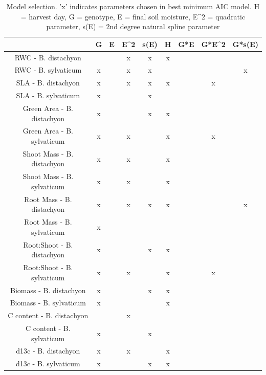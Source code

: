 \documentclass[jou,floatsintext]{apa6}
\begin{document}
\begin{table}[tbp]
\begin{center}
\begin{threeparttable}
\caption{\label{tab:models}Model selection. 'x' indicates parameters chosen in best minimum AIC model. H = harvest day, G = genotype, E = final soil moisture, E\textasciicircum{}2 = quadratic parameter, s(E) = 2nd degree natural spline parameter}
\scriptsize{
\begin{tabular}{ccccccccc}
\toprule
 & \multicolumn{1}{c}{G} & \multicolumn{1}{c}{E} & \multicolumn{1}{c}{E\textasciicircum{}2} & \multicolumn{1}{c}{s(E)} & \multicolumn{1}{c}{H} & \multicolumn{1}{c}{G*E} & \multicolumn{1}{c}{G*E\textasciicircum{}2} & \multicolumn{1}{c}{G*s(E)}\\
\midrule
RWC - B. distachyon &  &  & x & x & x &  &  & \\ \midrule
RWC - B. sylvaticum & x &  & x & x &  &  &  & x\\ \midrule
SLA - B. distachyon & x &  & x & x & x &  & x & \\ \midrule
SLA - B. sylvaticum & x &  &  & x &  &  &  & \\ \midrule
Green Area - B. distachyon & x &  &  & x & x &  &  & \\ \midrule
Green Area - B. sylvaticum & x &  & x &  & x &  & x & \\ \midrule
Shoot Mass - B. distachyon & x &  & x &  & x &  &  & \\ \midrule
Shoot Mass - B. sylvaticum & x &  & x &  & x &  &  & \\ \midrule
Root Mass - B. distachyon & x &  & x & x & x &  &  & x\\ \midrule
Root Mass - B. sylvaticum & x &  &  &  &  &  &  & \\ \midrule
Root:Shoot - B. distachyon & x &  &  & x & x &  &  & \\ \midrule
Root:Shoot - B. sylvaticum & x &  & x &  & x &  & x & \\ \midrule
Biomass - B. distachyon & x &  &  & x & x &  &  & \\ \midrule
Biomass - B. sylvaticum & x &  &  &  & x &  &  & \\ \midrule
C content - B. distachyon &  &  & x &  &  &  &  & \\ \midrule
C content - B. sylvaticum & x &  &  & x &  &  &  & \\ \midrule
d13c - B. distachyon & x &  & x &  & x &  &  & \\ \midrule
d13c - B. sylvaticum & x &  &  & x & x &  &  & \\ \midrule

\end{tabular}}
\end{threeparttable}
\end{center}
\end{table}
\end{document}

